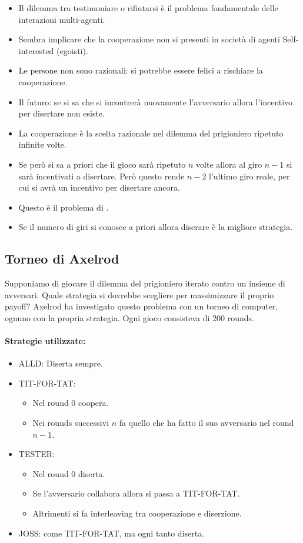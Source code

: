 \begin{itemize}
  \item Il dilemma tra testimoniare o rifiutarsi è il problema fondamentale delle interazioni multi-agenti. 
  \item Sembra implicare che la cooperazione non si presenti in società di agenti Self-interested (egoisti). 
  \item Le persone non sono razionali: si potrebbe essere felici a rischiare la cooperazione. 
  \item Il futuro: se si sa che si incontrerà nuovamente l'avversario allora l'incentivo per disertare non esiste. 
  \item La cooperazione è la scelta razionale nel dilemma del prigioniero ripetuto infinite volte.
  \item Se però si sa a priori che il gioco sarà ripetuto $n$ volte allora al giro $n - 1$ si sarà incentivati a disertare. Però questo rende $n - 2$ l'ultimo giro reale, per cui si avrà un incentivo per disertare ancora. 
  \item Questo è il problema di . 
  \item Se il numero di giri si conosce a priori allora diserare è la migliore strategia.
\end{itemize}

\subsection{Torneo di Axelrod}

Supponiamo di giocare il dilemma del prigioniero iterato contro un insieme di avversari. Quale strategia si dovrebbe scegliere per massimizzare il proprio payoff? Axelrod ha investigato questo problema con un torneo di computer, ognuno con la propria strategia. Ogni gioco consisteva di 200 rounds.

\paragraph{Strategie utilizzate:}

\begin{itemize}
  \item ALLD: Diserta sempre.
  \item TIT-FOR-TAT:
  \begin{itemize}
    \item Nel round 0 coopera. 
    \item Nei rounds successivi $n$ fa quello che ha fatto il suo avversario nel round $n - 1$.
  \end{itemize}
\item TESTER:
  \begin{itemize}
    \item Nel round 0 diserta. 
    \item Se l'avversario collabora allora si passa a TIT-FOR-TAT.
    \item Altrimenti si fa interleaving tra cooperazione e diserzione.
  \end{itemize}
\item JOSS: come TIT-FOR-TAT, ma ogni tanto diserta.
\end{itemize}

